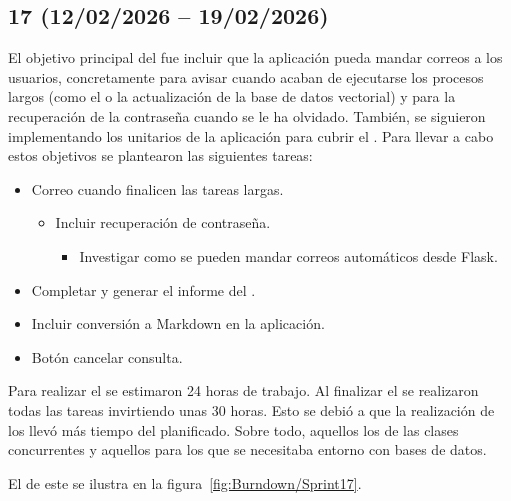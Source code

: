 \subsection{ 17 (12/02/2026 -- 19/02/2026)}
El objetivo principal del  fue incluir que la aplicación pueda mandar correos a los usuarios, concretamente para avisar cuando acaban de ejecutarse los procesos largos (como el  o la actualización de la base de datos vectorial) y para la recuperación de la contraseña cuando se le ha olvidado. También, se siguieron implementando los  unitarios de la aplicación para cubrir el . Para llevar a cabo estos objetivos se plantearon las siguientes tareas:
\begin{itemize}
\tightlist
	\item Correo cuando finalicen las tareas largas.
	\begin{itemize}
	\tightlist
		\item Incluir recuperación de contraseña.
		\begin{itemize}
		\tightlist
			\item Investigar como se pueden mandar correos automáticos desde Flask.
		\end{itemize}
	\end{itemize}
	\item Completar  y generar el informe del .
	\item Incluir conversión a Markdown en la aplicación.
	\item Botón cancelar consulta.
\end{itemize}

Para realizar el  se estimaron 24 horas de trabajo. Al finalizar el  se realizaron todas las tareas invirtiendo unas 30 horas. Esto se debió a que la realización de los  llevó más tiempo del planificado. Sobre todo, aquellos los de las clases concurrentes y aquellos para los que se necesitaba entorno con bases de datos.

El  de este  se ilustra en la figura~\ref{fig:Burndown/Sprint17}.

